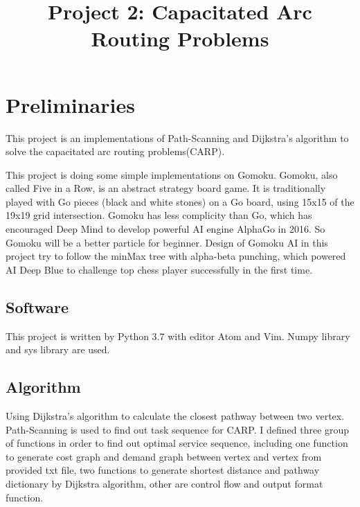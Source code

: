 \documentclass[conference,compsoc]{IEEEtran}
\begin{document}
\title{Project 2: Capacitated Arc Routing Problems }

\author{
}

\maketitle

\IEEEpeerreviewmaketitle

\section{Preliminaries}
This project is an implementations of Path-Scanning and Dijkstra's algorithm to
solve the capacitated arc routing problems(CARP). 

This project is doing some simple implementations on Gomoku. Gomoku, also called 
Five in a Row, is an abstract strategy board game. It is traditionally played 
with Go pieces (black and white stones) on a Go board, using 15x15 of the 19x19
grid intersection.\cite{1} Gomoku has less complicity than Go, which has encouraged
Deep Mind to develop powerful AI engine AlphaGo in 2016. So Gomoku will be a
better particle for beginner. Design of Gomoku AI in this project try to
follow the minMax tree with alpha-beta punching, which powered AI Deep Blue to
challenge top chess player successfully in the first time.

\subsection{Software}
This project is written by Python 3.7 with editor Atom and Vim. Numpy library
and sys library are used.

\subsection{Algorithm}
Using Dijkstra's algorithm to calculate the closest pathway between two vertex.
Path-Scanning is used to find out task sequence for CARP. I defined three group
of functions in order to find out optimal service sequence, including one
function to generate cost graph and demand graph between vertex and vertex
from provided txt file, two functions to generate shortest distance and pathway
dictionary by Dijkstra algorithm, other are control flow and output format
function.
\end{document}
